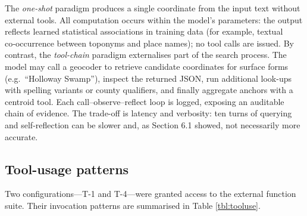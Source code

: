 The \emph{one-shot} paradigm produces a single coordinate from the input
text without external tools. All computation occurs within the model's
parameters: the output reflects learned statistical associations in
training data (for example, textual co‑occurrence between toponyms and
place names); no tool calls are issued. By contrast, the
\emph{tool-chain} paradigm externalises part of the search process. The
model may call a geocoder to retrieve candidate coordinates for surface
forms (e.g.~``Holloway Swamp''), inspect the returned JSON, run
additional look-ups with spelling variants or county qualifiers, and
finally aggregate anchors with a centroid tool. Each
call--observe--reflect loop is logged, exposing an auditable chain of
evidence. The trade-off is latency and verbosity: ten turns of querying
and self-reflection can be slower and, as Section 6.1 showed, not
necessarily more accurate.

\subsection{Tool-usage patterns}\label{tool-usage-patterns}

Two configurations---T-1 and T-4---were granted access to the external
function suite. Their invocation patterns are summarised in Table
\ref{tbl:tooluse}.

